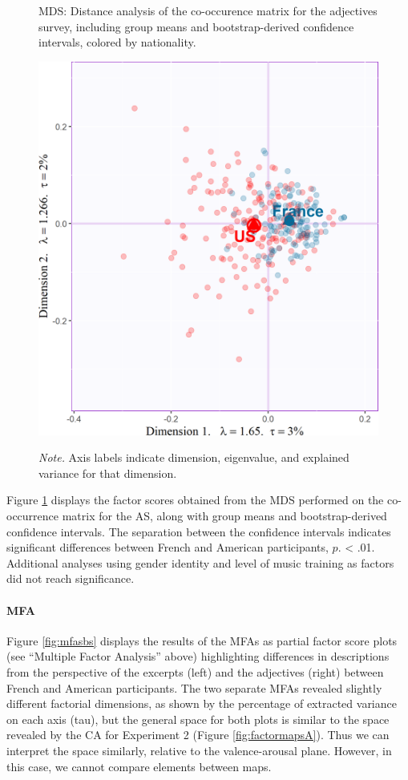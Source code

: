 \documentclass[
  english,
  man,floatsintext]{apa6}
\let\oldparagraph\paragraph
\renewcommand{\paragraph}[1]{\oldparagraph{#1}\mbox{}}
\begin{document}
\begin{figure}   
  \centering  
  \caption{MDS: Distance analysis of the co-occurence matrix for the adjectives survey, including group means and bootstrap-derived confidence intervals, colored by nationality.}
    \includegraphics[width=0.4\columnwidth]{./Music-Descriptor-Space_files/figure-latex/map4RVAcode-1.png}
  \label{fig:map4RVA}
  \caption*{\footnotesize \textit{Note.} Axis labels indicate dimension, eigenvalue, and explained variance for that dimension.}
\end{figure}

Figure \ref{fig:map4RVA} displays the factor scores obtained from the MDS performed on the co-occurrence matrix for the AS, along with group means and bootstrap-derived confidence intervals. The separation between the confidence intervals indicates significant differences between French and American participants, \(\textit{p}\). \textless{} .01. Additional analyses using gender identity and level of music training as factors did not reach significance.

\hypertarget{mfa}{%
\paragraph{MFA}\label{mfa}}

Figure \ref{fig:mfasbs} displays the results of the MFAs as partial factor score plots (see ``Multiple Factor Analysis'' above) highlighting differences in descriptions from the perspective of the excerpts (left) and the adjectives (right) between French and American participants. The two separate MFAs revealed slightly different factorial dimensions, as shown by the percentage of extracted variance on each axis (tau), but the general space for both plots is similar to the space revealed by the CA for Experiment 2 (Figure \ref{fig:factormapsA}). Thus we can interpret the space similarly, relative to the valence-arousal plane. However, in this case, we cannot compare elements between maps.
\end{document}
